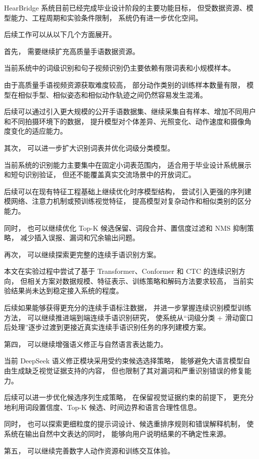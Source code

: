 HearBridge 系统目前已经完成毕业设计阶段的主要功能目标，
但受数据资源、模型能力、工程周期和实验条件限制，
系统仍有进一步优化空间。

后续工作可以从以下几个方面展开。

首先，
需要继续扩充高质量手语数据资源。

当前系统中的词级识别和句子视频识别仍主要依赖有限词表和小规模样本。

由于高质量手语视频资源获取难度较高，
部分动作类别的训练样本数量有限，
模型在相似手型、相似姿态和相似动作轨迹之间仍然容易发生混淆。

后续可以通过引入更大规模的公开手语数据集、继续采集自有样本、增加不同用户和不同拍摄环境下的数据，
提升模型对个体差异、光照变化、动作速度和摄像角度变化的适应能力。

其次，
可以进一步扩大识别词表并优化词级分类模型。

当前系统的识别能力主要集中在固定小词表范围内，
适合用于毕业设计系统展示和短句识别验证，
但还不能覆盖真实交流场景中的开放词汇。

后续可以在现有特征工程基础上继续优化时序模型结构，
尝试引入更强的序列建模网络、注意力机制或预训练视觉特征，
提高模型对复杂动作和相似类别的区分能力。

同时，
也可以继续优化 Top-K 候选保留、词段合并、置信度过滤和 NMS 抑制策略，
减少插入误报、漏词和冗余输出问题。

再次，
可以继续探索更完整的连续手语识别方案。

本文在实验过程中尝试了基于 Transformer、Conformer 和 CTC 的连续识别方向，
但相关方案对数据规模、特征表示、训练策略和解码方法要求较高，
当前实验结果尚未达到稳定接入系统的程度。

后续如果能够获得更充分的连续手语标注数据，
并进一步掌握连续识别模型训练方法，
可以继续推进端到端连续手语识别研究，
使系统从“词级分类 + 滑动窗口后处理”逐步过渡到更接近真实连续手语识别任务的序列建模方案。

第四，
可以继续增强语义修正与自然语言表达能力。

当前 DeepSeek 语义修正模块采用受约束候选选择策略，
能够避免大语言模型自由生成缺乏视觉证据支持的内容，
但也限制了其对漏词和严重识别错误的修复能力。

后续可以进一步优化候选序列生成策略，
在保留视觉证据约束的前提下，
更充分地利用词段置信度、Top-K 候选、时间边界和语言合理性信息。

同时，
也可以探索更细粒度的提示词设计、候选重排序规则和错误解释机制，
使系统在输出自然中文表达的同时，
能够向用户说明结果的不确定性来源。

第五，
可以继续完善数字人动作资源和训练交互体验。

